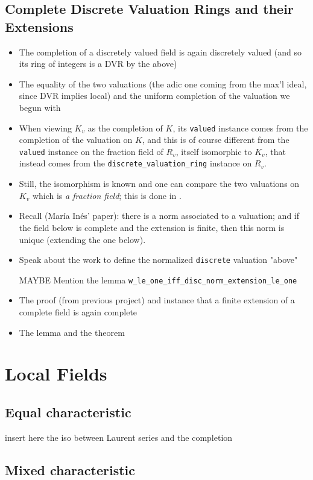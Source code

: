 \documentclass[sigplan,10pt,anonymous,review]{acmart}\settopmatter{printfolios=true,printccs=false,printacmref=false}
\begin{document}
\subsection{Complete Discrete Valuation Rings and their Extensions}
\begin{itemize}
\item The completion of a discretely valued field is again discretely valued (and so its ring of integers is a DVR by the above)
\item The equality of the two valuations (the adic one coming from the max'l ideal, since DVR implies local) and the uniform completion of the valuation we begun with
\item When viewing $K_v$ as the completion of $K$, its \texttt{valued} instance comes from the completion of the valuation on $K$, and this is of course different from the \texttt{valued} instance on the fraction field of $R_v$, itself isomorphic to $K_v$, that instead comes from the \texttt{discrete_valuation_ring} instance on $R_v$.
\item Still, the isomorphism is known and one can compare the two valuations on $K_v$ which is \emph{a fraction field}; this is done in .
\item Recall (María Inés' paper): there is a norm associated to a valuation; and if the field below is complete and the extension is finite, then this norm is unique (extending the one below).
\item Speak about the work to define the normalized \texttt{discrete} valuation "above"
\item [MAYBE] Mention the lemma \texttt{w\_le\_one\_iff\_disc\_norm\_extension\_le\_one}
\item The proof (from previous project) and instance that a finite extension of a complete field is again complete
\item The lemma  and the theorem 
\end{itemize}
\section{Local Fields}
\subsection{Equal characteristic}
insert here the iso between Laurent series and the completion
\subsection{Mixed characteristic}
\end{document}
